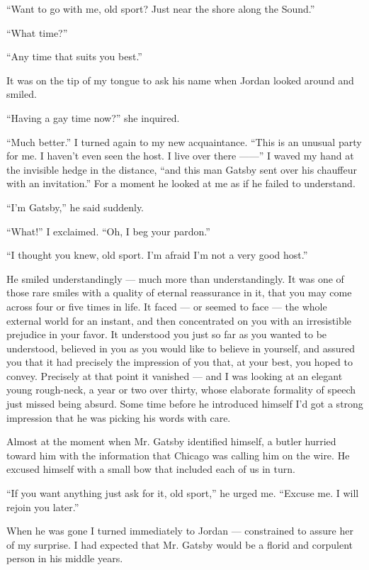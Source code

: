 \documentclass{znotebook}
\begin{document}
``Want to go with me, old sport? Just near the shore along the Sound.''

``What time?''

``Any time that suits you best.''

It was on the tip of my tongue to ask his name when Jordan looked around and smiled.

``Having a gay time now?'' she inquired.

``Much better.'' I turned again to my new acquaintance. ``This is an unusual party for me. I haven't even seen the host. I live over there ——'' I waved my hand at the invisible hedge in the distance, ``and this man Gatsby sent over his chauffeur with an invitation.'' For a moment he looked at me as if he failed to understand.

``I'm Gatsby,'' he said suddenly.

``What!'' I exclaimed. ``Oh, I beg your pardon.''

``I thought you knew, old sport. I'm afraid I'm not a very good host.''

He smiled understandingly — much more than understandingly. It was one of those rare smiles with a quality of eternal reassurance in it, that you may come across four or five times in life. It faced — or seemed to face — the whole external world for an instant, and then concentrated on you with an irresistible prejudice in your favor. It understood you just so far as you wanted to be understood, believed in you as you would like to believe in yourself, and assured you that it had precisely the impression of you that, at your best, you hoped to convey. Precisely at that point it vanished — and I was looking at an elegant young rough-neck, a year or two over thirty, whose elaborate formality of speech just missed being absurd. Some time before he introduced himself I'd got a strong impression that he was picking his words with care.

Almost at the moment when Mr. Gatsby identified himself, a butler hurried toward him with the information that Chicago was calling him on the wire. He excused himself with a small bow that included each of us in turn.

``If you want anything just ask for it, old sport,'' he urged me. ``Excuse me. I will rejoin you later.''

When he was gone I turned immediately to Jordan — constrained to assure her of my surprise. I had expected that Mr. Gatsby would be a florid and corpulent person in his middle years.
\end{document}
